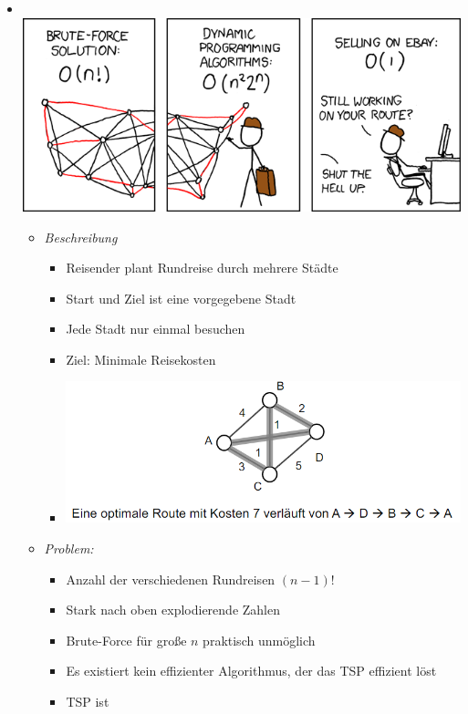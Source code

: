 \documentclass[
    12pt,
    a4paper,
    ngerman,
    color=3b,%
    marginpar=false,
    colorback=false,
    leqno,
]{tudaexercise}
\begin{document}
\begin{itemize}
          \pagebreak

    \item {}\\
          \includegraphics[width=.5\textwidth]{pictures/traveling_salesman.png}
    \begin{itemize}
              \item \textit{Beschreibung}
                    \begin{itemize}
                        \item Reisender plant Rundreise durch mehrere Städte
                        \item Start und Ziel ist eine vorgegebene Stadt
                        \item Jede Stadt nur einmal besuchen
                        \item Ziel: Minimale Reisekosten
                        \item[] \includegraphics[width=12cm]{pictures/tsp1.PNG}
                    \end{itemize}
              \item \textit{Problem:}
                    \begin{itemize}
                        \item Anzahl der verschiedenen Rundreisen $(n-1)!$
                        \item Stark nach oben explodierende Zahlen
                        \item Brute-Force für gro\ss{}e $n$ praktisch unmöglich
                        \item Es existiert kein effizienter Algorithmus, der das TSP effizient löst
                        \item TSP ist 

\end{itemize}
\end{itemize}
\end{itemize}
\end{document}
